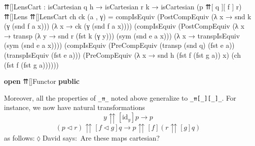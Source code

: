 \documentclass[
  11pt,
  oneside,
  article]{memoir}
\newenvironment{Shaded}{}{}
\newcommand{\KeywordTok}[1]{\textcolor[rgb]{0.00,0.44,0.13}{\textbf{#1}}}
\newcommand{\NormalTok}[1]{#1}
\newcommand{\OtherTok}[1]{\textcolor[rgb]{0.00,0.44,0.13}{#1}}
\theoremstyle{definition}
\theoremstyle{plain}
\newcommand{\0}{\textsf{0}}
\newcommand{\1}{\tn{\textsf{1}}}
\newcommand{\dnote}[1]{{\quad \color{blue}$\lozenge$\;David says:}~#1\;{\color{blue}$\lozenge$}\quad}
\begin{document}
\begin{Shaded}
\begin{Highlighting}[]
\NormalTok{    ⇈[]LensCart }\OtherTok{:}\NormalTok{ isCartesian q h }\OtherTok{→}\NormalTok{ isCartesian r\textquotesingle{} k}
                  \OtherTok{→}\NormalTok{ isCartesian }\OtherTok{(}\NormalTok{p\textquotesingle{} ⇈[ q\textquotesingle{} ][ f\textquotesingle{} ] r\textquotesingle{}}\OtherTok{)}\NormalTok{ ⇈[]Lens}
\NormalTok{    ⇈[]LensCart ch ck }\OtherTok{(}\NormalTok{a , γ}\OtherTok{)} \OtherTok{=} 
\NormalTok{        compIsEquiv }
            \OtherTok{(}\NormalTok{PostCompEquiv }\OtherTok{(λ}\NormalTok{ x }\OtherTok{→}\NormalTok{ snd k }\OtherTok{(}\NormalTok{γ }\OtherTok{(}\NormalTok{snd f a x}\OtherTok{)))} 
                           \OtherTok{(λ}\NormalTok{ x }\OtherTok{→}\NormalTok{ ck }\OtherTok{(}\NormalTok{γ }\OtherTok{(}\NormalTok{snd f a x}\OtherTok{))))} 
            \OtherTok{(}\NormalTok{compIsEquiv }
                \OtherTok{(}\NormalTok{PostCompEquiv }
                    \OtherTok{(λ}\NormalTok{ x }\OtherTok{→}\NormalTok{ transp }\OtherTok{(λ}\NormalTok{ y }\OtherTok{→}\NormalTok{ snd r\textquotesingle{} }\OtherTok{(}\NormalTok{fst k }\OtherTok{(}\NormalTok{γ y}\OtherTok{)))} 
                                  \OtherTok{(}\NormalTok{sym }\OtherTok{(}\NormalTok{snd e a x}\OtherTok{)))} 
                    \OtherTok{(λ}\NormalTok{ x }\OtherTok{→}\NormalTok{ transpIsEquiv }\OtherTok{(}\NormalTok{sym }\OtherTok{(}\NormalTok{snd e a x}\OtherTok{))))} 
                \OtherTok{(}\NormalTok{compIsEquiv }
                    \OtherTok{(}\NormalTok{PreCompEquiv }\OtherTok{(}\NormalTok{transp }\OtherTok{(}\NormalTok{snd q}\OtherTok{)} \OtherTok{(}\NormalTok{fst e a}\OtherTok{))} 
                                  \OtherTok{(}\NormalTok{transpIsEquiv }\OtherTok{(}\NormalTok{fst e a}\OtherTok{)))} 
                    \OtherTok{(}\NormalTok{PreCompEquiv }\OtherTok{(λ}\NormalTok{ x }\OtherTok{→}\NormalTok{ snd h }\OtherTok{(}\NormalTok{fst f\textquotesingle{} }\OtherTok{(}\NormalTok{fst g a}\OtherTok{))}\NormalTok{ x}\OtherTok{)} 
                                  \OtherTok{(}\NormalTok{ch }\OtherTok{(}\NormalTok{fst f\textquotesingle{} }\OtherTok{(}\NormalTok{fst g a}\OtherTok{))))))}

\KeywordTok{open}\NormalTok{ ⇈[]Functor }\KeywordTok{public}
\end{Highlighting}
\end{Shaded}

Moreover, all the properties of \texttt{\_⇈\_} noted above generalize to
\texttt{\_⇈{[}\_{]}{[}\_{]}\_}. For instance, we now have natural
transformations \[
y {\upuparrows}[\text{id}_{y}] p \to p
\] \[
(p \triangleleft r) {\upuparrows}[f \triangleleft g] q \to p {\upuparrows}[f] (r {\upuparrows}[g] q)
\] as follows:\dnote{Are these maps cartesian?}
\end{document}
